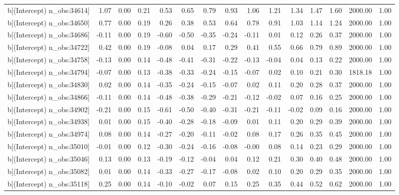 \begin{table}[ht]
\begin{tabular}{rrrrrrrrrrrrrrr}
  b[(Intercept) n\_obs:34614] & 1.07 & 0.00 & 0.21 & 0.53 & 0.65 & 0.79 & 0.93 & 1.06 & 1.21 & 1.34 & 1.47 & 1.60 & 2000.00 & 1.00 \\ 
  b[(Intercept) n\_obs:34650] & 0.77 & 0.00 & 0.19 & 0.26 & 0.38 & 0.53 & 0.64 & 0.78 & 0.91 & 1.03 & 1.14 & 1.24 & 2000.00 & 1.00 \\ 
  b[(Intercept) n\_obs:34686] & -0.11 & 0.00 & 0.19 & -0.60 & -0.50 & -0.35 & -0.24 & -0.11 & 0.01 & 0.12 & 0.26 & 0.37 & 2000.00 & 1.00 \\ 
  b[(Intercept) n\_obs:34722] & 0.42 & 0.00 & 0.19 & -0.08 & 0.04 & 0.17 & 0.29 & 0.41 & 0.55 & 0.66 & 0.79 & 0.89 & 2000.00 & 1.00 \\ 
  b[(Intercept) n\_obs:34758] & -0.13 & 0.00 & 0.14 & -0.48 & -0.41 & -0.31 & -0.22 & -0.13 & -0.04 & 0.04 & 0.13 & 0.22 & 2000.00 & 1.00 \\ 
  b[(Intercept) n\_obs:34794] & -0.07 & 0.00 & 0.13 & -0.38 & -0.33 & -0.24 & -0.15 & -0.07 & 0.02 & 0.10 & 0.21 & 0.30 & 1818.18 & 1.00 \\ 
  b[(Intercept) n\_obs:34830] & 0.02 & 0.00 & 0.14 & -0.35 & -0.24 & -0.15 & -0.07 & 0.02 & 0.11 & 0.20 & 0.28 & 0.37 & 2000.00 & 1.00 \\ 
  b[(Intercept) n\_obs:34866] & -0.11 & 0.00 & 0.14 & -0.48 & -0.38 & -0.29 & -0.21 & -0.12 & -0.02 & 0.07 & 0.16 & 0.25 & 2000.00 & 1.00 \\ 
  b[(Intercept) n\_obs:34902] & -0.21 & 0.00 & 0.15 & -0.61 & -0.50 & -0.40 & -0.31 & -0.21 & -0.11 & -0.02 & 0.09 & 0.16 & 2000.00 & 1.00 \\ 
  b[(Intercept) n\_obs:34938] & 0.01 & 0.00 & 0.15 & -0.40 & -0.28 & -0.18 & -0.09 & 0.01 & 0.11 & 0.20 & 0.29 & 0.39 & 2000.00 & 1.00 \\ 
  b[(Intercept) n\_obs:34974] & 0.08 & 0.00 & 0.14 & -0.27 & -0.20 & -0.11 & -0.02 & 0.08 & 0.17 & 0.26 & 0.35 & 0.45 & 2000.00 & 1.00 \\ 
  b[(Intercept) n\_obs:35010] & -0.01 & 0.00 & 0.12 & -0.30 & -0.24 & -0.16 & -0.08 & -0.00 & 0.08 & 0.14 & 0.23 & 0.29 & 2000.00 & 1.00 \\ 
  b[(Intercept) n\_obs:35046] & 0.13 & 0.00 & 0.13 & -0.19 & -0.12 & -0.04 & 0.04 & 0.12 & 0.21 & 0.30 & 0.40 & 0.48 & 2000.00 & 1.00 \\ 
  b[(Intercept) n\_obs:35082] & 0.01 & 0.00 & 0.14 & -0.33 & -0.27 & -0.17 & -0.08 & 0.02 & 0.10 & 0.20 & 0.29 & 0.35 & 2000.00 & 1.00 \\ 
  b[(Intercept) n\_obs:35118] & 0.25 & 0.00 & 0.14 & -0.10 & -0.02 & 0.07 & 0.15 & 0.25 & 0.35 & 0.44 & 0.52 & 0.62 & 2000.00 & 1.00 \\ 

\end{tabular}
\end{table}
